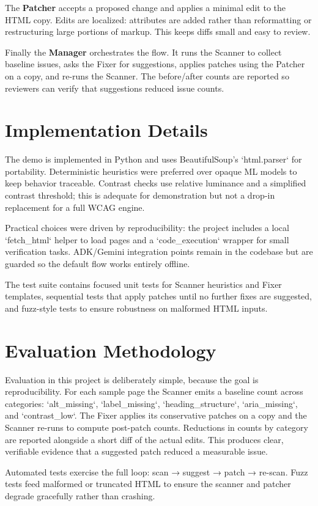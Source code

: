 \documentclass[10pt,twocolumn]{article}
\begin{document}
The \textbf{Patcher} accepts a proposed change and applies a minimal edit to the HTML copy. Edits are localized: attributes are added rather than reformatting or restructuring large portions of markup. This keeps diffs small and easy to review.

Finally the \textbf{Manager} orchestrates the flow. It runs the Scanner to collect baseline issues, asks the Fixer for suggestions, applies patches using the Patcher on a copy, and re-runs the Scanner. The before/after counts are reported so reviewers can verify that suggestions reduced issue counts.

\section{Implementation Details}
The demo is implemented in Python and uses BeautifulSoup's `html.parser` for portability. Deterministic heuristics were preferred over opaque ML models to keep behavior traceable. Contrast checks use relative luminance and a simplified contrast threshold; this is adequate for demonstration but not a drop-in replacement for a full WCAG engine.

Practical choices were driven by reproducibility: the project includes a local `fetch_html` helper to load pages and a `code_execution` wrapper for small verification tasks. ADK/Gemini integration points remain in the codebase but are guarded so the default flow works entirely offline.

The test suite contains focused unit tests for Scanner heuristics and Fixer templates, sequential tests that apply patches until no further fixes are suggested, and fuzz-style tests to ensure robustness on malformed HTML inputs.

\section{Evaluation Methodology}
Evaluation in this project is deliberately simple, because the goal is reproducibility. For each sample page the Scanner emits a baseline count across categories: `alt_missing`, `label_missing`, `heading_structure`, `aria_missing`, and `contrast_low`. The Fixer applies its conservative patches on a copy and the Scanner re-runs to compute post-patch counts. Reductions in counts by category are reported alongside a short diff of the actual edits. This produces clear, verifiable evidence that a suggested patch reduced a measurable issue.

Automated tests exercise the full loop: scan → suggest → patch → re-scan. Fuzz tests feed malformed or truncated HTML to ensure the scanner and patcher degrade gracefully rather than crashing.
\end{document}
